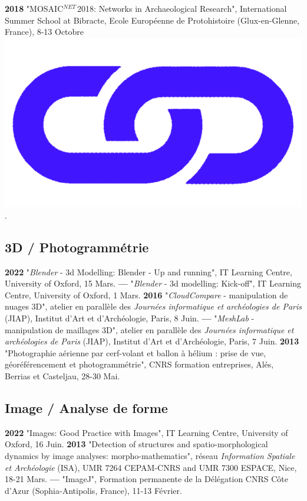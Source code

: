 \documentclass{article}
\begin{document}
\textbf{2018 }"MOSAIC${}^{NET\ }$2018: Networks in Archaeological Research", International Summer School at Bibracte, Ecole Europ\'{e}enne de Protohistoire (Glux-en-Glenne, France), 8-13 Octobre \href{https://www.ufg.uni-kiel.de/en/news_expired/events-ufg/conferences-exhibitions/mosaic-2018}{\includegraphics[scale=0.02]{link_darkblue.png}}.

\subsection*{3D / Photogrammétrie}

\textbf{2022 }"\textit{Blender} - 3d Modelling: Blender - Up and running", IT Learning Centre, University of Oxford, 15 Mars.
\smallbreak
\textbf{--- }"\textit{Blender} - 3d modelling: Kick-off", IT Learning Centre, University of Oxford, 1 Mars.
\smallbreak
\textbf{2016 }"\textit{CloudCompare} - manipulation de nuages 3D", atelier en parallèle des \textit{Journ\'{e}es informatique et arch\'{e}ologies de Paris} (JIAP), Institut d'Art et d'Arch\'{e}ologie, Paris, 8 Juin.
\smallbreak
\textbf{--- }"\textit{MeshLab }- manipulation de maillages 3D", atelier en parallèle des \textit{Journ\'{e}es informatique et arch\'{e}ologies de Paris} (JIAP), Institut d'Art et d'Arch\'{e}ologie, Paris, 7 Juin.
\smallbreak
\textbf{2013 }"Photographie aérienne par cerf-volant et ballon à hélium : prise de vue, géoréférencement et photogrammétrie", CNRS formation entreprises, Al\'{e}s, Berrias et Casteljau, 28-30 Mai.

\subsection*{Image / Analyse de forme}

\textbf{2022 }"Images: Good Practice with Images", IT Learning Centre, University of Oxford, 16 Juin.
\smallbreak
\textbf{2013 }"Detection of structures and spatio-morphological dynamics by image analyses: morpho-mathematics", réseau \textit{Information Spatiale et Arch\'{e}ologie} (ISA), UMR 7264 CEPAM-CNRS and UMR 7300 ESPACE, Nice, 18-21 Mars.
\smallbreak
\textbf{--- }"ImageJ", Formation permanente de la Délégation CNRS Côte d'Azur (Sophia-Antipolis, France), 11-13 Février.
\end{document}

